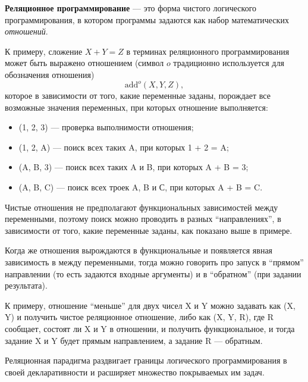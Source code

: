 {\bf Реляционное программирование} --- это форма чистого логического программирования,
в котором программы задаются как набор математических {\it отношений}.

К примеру, сложение $X + Y = Z$ в терминах реляционного программирования может
быть выражено отношением (символ $o$ традиционно используется для обозначения отношения)
\[\text{add}^o (X, Y, Z),\]
которое в зависимости от того, какие переменные заданы, порождает
все возможные значения переменных, при которых отношение выполняется:
\begin{itemize}
\item {}(1, 2, 3) --- проверка выполнимости отношения;
\item {}(1, 2, A) --- поиск всех таких A, при которых 1 + 2 = A;
\item {}(A, B, 3) --- поиск всех таких A и B, при которых A + B = 3;
\item {}(A, B, C) --- поиск всех троек A, B и С, при которых A + B = C.
\end{itemize}

Чистые отношения не предполагают функциональных зависимостей между переменными, поэтому
поиск можно проводить в разных ``направлениях'', в зависимости от того, какие переменные
заданы, как показано выше в примере.

Когда же отношения вырождаются в функциональные и появляется
явная зависимость в между переменными, тогда можно говорить про запуск
в ``прямом'' направлении (то есть задаются входные аргументы) и в ``обратном''
(при задании результата).

К примеру, отношение ``меньше'' для двух чисел X и Y можно задавать как (X, Y) и
получить чистое реляционное отношение, либо
как (X, Y, R), где R сообщает, состоят ли X и Y в отношении,
и получить функциональное, и тогда задание X и Y будет прямым направлением, а задание R --- обратным.

Реляционная парадигма раздвигает границы логического программирования в своей декларативности
и расширяет множество покрываемых им задач.

%
